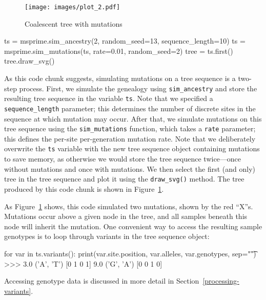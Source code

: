 \documentclass[graybox]{svmult}
\begin{document}
\begin{figure}[t]
\begin{center}
\texttt{[image: images/plot\_2.pdf]}
\end{center}
\caption{\label{fig-tree-mutations} Coalescent tree with mutations}
\end{figure}

\begin{pythoncode}
ts = msprime.sim_ancestry(2, random_seed=13, sequence_length=10)
ts = msprime.sim_mutations(ts, rate=0.01, random_seed=2)
tree = ts.first()
tree.draw_svg()
\end{pythoncode}

As this code chunk suggests, simulating mutations on a tree sequence is a two-step process.
First, we simulate the genealogy using \texttt{sim\_ancestry} and store the resulting
tree sequence in the variable \texttt{ts}. Note that we specified a \texttt{sequence\_length} parameter;
this determines the number of discrete sites in the sequence at which mutation
may occur. After that, we simulate mutations on this tree sequence 
using the \texttt{sim\_mutations} function, which takes a 
\texttt{rate} parameter; this
defines the per-site per-generation mutation rate. 
Note that we deliberately overwrite the \texttt{ts} variable
with the new tree sequence object containing 
mutations to save memory, as otherwise we would
store the tree sequence twice---once without mutations and once with mutations. 
We then
select the first (and only) tree in the tree sequence and plot it using the \texttt{draw\_svg()}
method. The tree produced by this code chunk is shown in Figure~\ref{fig-tree-mutations}.

As Figure~\ref{fig-tree-mutations} shows, this code simulated two mutations,
shown by the red ``X''s.
Mutations occur above a given node in the tree, and all samples beneath
this node will inherit the mutation.
One convenient way to access the resulting sample genotypes is to loop through variants in the
tree sequence object:

\begin{pythoncode}
for var in ts.variants():
    print(var.site.position, var.alleles, var.genotypes, sep="\t")
>>> 3.0	('A', 'T')	[0 1 0 1]
    9.0	('G', 'A')	[0 0 1 0]
\end{pythoncode}
Accessing genotype data is discussed in more detail in Section~\ref{processing-variants}.
\end{document}
